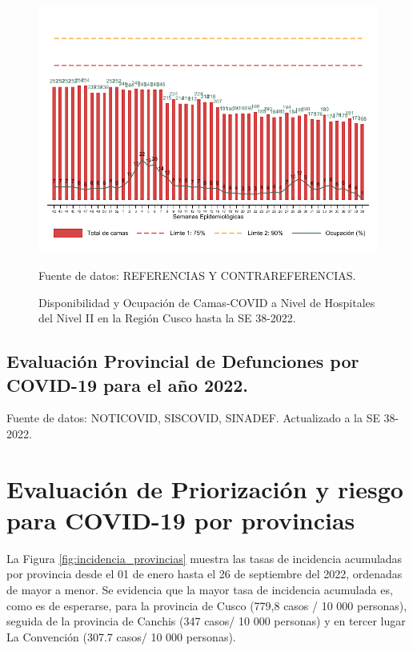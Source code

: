 \documentclass[12pt,a4paper,openany]{book}
\begin{document}
	\begin{figure}[h]
		\caption{Disponibilidad y Ocupación de Camas-COVID a Nivel de Hospitales del Nivel II en la Región Cusco hasta la SE 38-2022.}\label{fig:ocupacion_2nivel}
		\begin{center}
			\includegraphics[width=0.95\linewidth]{../figuras/nivel_2.pdf}
		\end{center}
		{\footnotesize {Fuente de datos: REFERENCIAS Y CONTRAREFERENCIAS.}}
	\end{figure}
	\clearpage
	\begin{landscape}
		
		\subsection*{Evaluación Provincial de Defunciones por COVID-19 para el año 2022.} 
		
		
		
		
		{\footnotesize Fuente de datos: NOTICOVID, SISCOVID, SINADEF. Actualizado a la SE 38-2022.}
		
		\noindent 
		
	\end{landscape}
	
	
	\clearpage
	
	\section*{Evaluación de Priorización y riesgo para COVID-19 por provincias}
	\noindent La Figura \ref{fig:incidencia_provincias} muestra las tasas de incidencia acumuladas por provincia desde el 01 de enero hasta el 26 de septiembre del 2022, ordenadas de mayor a menor. Se evidencia que la mayor tasa de incidencia acumulada es, como es de esperarse, para la provincia de Cusco (779,8 casos / 10 000 personas), seguida de la provincia de Canchis (347 casos/ 10 000 personas) y en tercer lugar La Convención (307.7 casos/ 10 000 personas).
	
\end{document}
